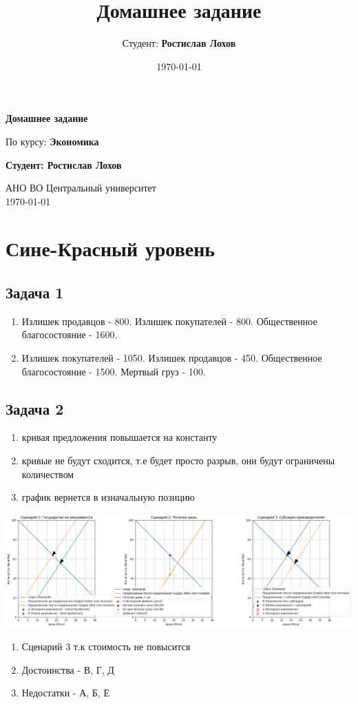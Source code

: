 \documentclass[a4paper,12pt]{article}
\title{Домашнее задание}
\author{Студент: \textbf{Ростислав Лохов}}
\date{\today}
\begin{document}
\begin{titlepage}
    \centering
    \vspace*{1cm}

    \Huge
    \textbf{Домашнее задание}

    \vspace{0.5cm}
    \LARGE
    По курсу: \textbf{Экономика}

    \vspace{1.5cm}

    \textbf{Студент: Ростислав Лохов}

    \vfill

    \Large
    АНО ВО Центральный университет\\
    \vspace{0.3cm}
    \today

\end{titlepage}

\tableofcontents
\newpage

\section{Сине-Красный уровень}


\subsection{Задача 1}
\begin{enumerate}
    \item Излишек продавцов - 800. Излишек покупателей - 800. Общественное благосостояние - 1600.
    \item Излишек покупателей - 1050. Излишек продавцов - 450. Общественное благосостояние - 1500. Мертвый груз - 100. 
\end{enumerate}

\subsection{Задача 2}
\begin{enumerate}
    \item кривая предложения повышается на константу 
    \item кривые не будут сходится, т.е будет просто разрыв, они будут ограничены количеством
    \item график вернется в изначальную позицию
\end{enumerate}
\includegraphics[scale=0.4]{graphs/3.1.png}
\begin{enumerate}
    \item Сценарий 3 т.к стоимость не повысится
    \item Достоинства - В, Г, Д
    \item Недостатки - А, Б, Е
\end{enumerate}
\end{document}
